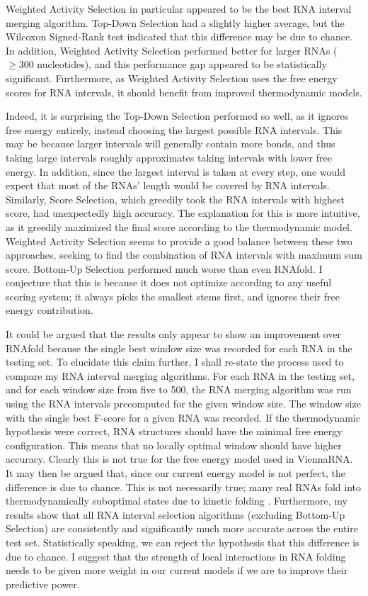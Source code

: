 \documentclass{cshonours}
\begin{document}
Weighted Activity Selection in particular appeared to be the best RNA interval merging algorithm. Top-Down Selection had a slightly higher average, but the Wilcoxon Signed-Rank test indicated that this difference may be due to chance. In addition, Weighted Activity Selection performed better for larger RNAs ($\geq 300$ nucleotides), and this performance gap appeared to be statistically significant. Furthermore, as Weighted Activity Selection uses the free energy scores for RNA intervals, it should benefit from improved thermodynamic models.

Indeed, it is surprising the Top-Down Selection performed so well, as it ignores free energy entirely, instead choosing the largest possible RNA intervals. This may be because larger intervals will generally contain more bonds, and thus taking large intervals roughly approximates taking intervals with lower free energy. In addition, since the largest interval is taken at every step, one would expect that most of the RNAs' length would be covered by RNA intervals. Similarly, Score Selection, which greedily took the RNA intervals with highest score, had unexpectedly high accuracy. The explanation for this is more intuitive, as it greedily maximized the final score according to the thermodynamic model. Weighted Activity Selection seems to provide a good balance between these two approaches, seeking to find the combination of RNA intervals with maximum sum score. Bottom-Up Selection performed much worse than even RNAfold. I conjecture that this is because it does not optimize according to any useful scoring system; it always picks the smallest stems first, and ignores their free energy contribution.

It could be argued that the results only appear to show an improvement over RNAfold because the single best window size was recorded for each RNA in the testing set. To elucidate this claim further, I shall re-state the process used to compare my RNA interval merging algorithms. For each RNA in the testing set, and for each window size from five to 500, the RNA merging algorithm was run using the RNA intervals precomputed for the given window size. The window size with the single best F-score for a given RNA was recorded. If the thermodynamic hypothesis were correct, RNA structures should have the minimal free energy configuration. This means that no locally optimal window should have higher accuracy. Clearly this is not true for the free energy model used in ViennaRNA. It may then be argued that, since our current energy model is not perfect, the difference is due to chance. This is not necessarily true; many real RNAs fold into thermodynamically suboptimal states due to kinetic folding \cite{ditzler2008rugged, treiber2001beyond}. Furthermore, my results show that all RNA interval selection algorithms (excluding Bottom-Up Selection) are consistently and significantly much more accurate across the entire test set. Statistically speaking, we can reject the hypothesis that this difference is due to chance. I suggest that the strength of local interactions in RNA folding needs to be given more weight in our current models if we are to improve their predictive power.
\end{document}
